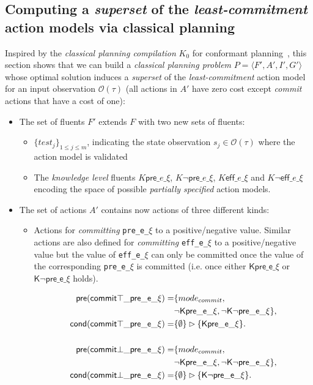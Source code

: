 \documentclass{article}
\newcommand{\tup}[1]{{\langle #1 \rangle}}
\newcommand{\pre}{\mathsf{pre}}     %
\newcommand{\eff}{\mathsf{eff}}     %
\newcommand{\cond}{\mathsf{cond}}   %
\begin{document}
\subsection{Computing a {\em superset} of the {\em least-commitment} action models via classical planning}
Inspired by the {\em classical planning compilation} $K_0$ for conformant planning~\cite{palacios-conformant-JAIR09}, this section shows that we can build a {\em classical planning problem} $P=\tup{F',A',I',G'}$ whose optimal solution induces a {\em superset} of the {\em least-commitment} action model for an input observation $\mathcal{O}(\tau)$ (all actions in $A'$ have zero cost except {\em commit} actions that have a cost of one): 
\begin{itemize}
\item The set of fluents $F'$ extends $F$ with two new sets of fluents:
      \begin{itemize}
      \item $\{test_j\}_{1\leq j\leq m}$, indicating the state observation $s_j\in\mathcal{O}(\tau)$ where the action model is validated
      \item The {\em knowledge level} fluents {\tt\small $K\pre\_e\_\xi$}, {\tt\small $K\neg\pre\_e\_\xi$}, {\tt\small $K\eff\_e\_\xi$} and {\tt\small $K\neg\eff\_e\_\xi$} encoding the space of possible {\em partially specified} action models.
      \end {itemize}
\item The set of actions $A'$ contains now actions of three different kinds:
\begin{itemize}
      \item Actions for {\em committing} {\tt\small pre\_e\_$\xi$} to a positive/negative value. Similar actions are also defined for {\em committing} {\tt\small eff\_e\_$\xi$} to a positive/negative value but the value of {\tt\small eff\_e\_$\xi$} can only be committed once the value of the corresponding {\tt\small pre\_e\_$\xi$} is committed (i.e. once either $\mathsf{K\pre\_e\_\xi}$ or $\mathsf{K\neg\pre\_e\_\xi}$ holds).
\begin{small}
\begin{align*}
\hspace*{7pt}\pre(\mathsf{commit\top\_pre\_e\_\xi})=&\{mode_{commit}, \\
&\mathsf{\neg K\pre\_e\_\xi}, \mathsf{\neg K\neg\pre\_e\_\xi}\},\\
\cond(\mathsf{commit\top\_pre\_e\_\xi})=&\{\emptyset\}\rhd\{\mathsf{K\pre\_e\_\xi}\}.\\\\
\hspace*{7pt}\pre(\mathsf{commit\bot\_pre\_e\_\xi})=&\{mode_{commit}, \\
&\mathsf{\neg K\pre\_e\_\xi},\mathsf{\neg K\neg\pre\_e\_\xi}\},\\
\cond(\mathsf{commit\bot\_pre\_e\_\xi})=&\{\emptyset\}\rhd\{\mathsf{K\neg\pre\_e\_\xi}\}.
\end{align*}
\end{small}


\end{itemize}
\end{itemize}
\end{document}
